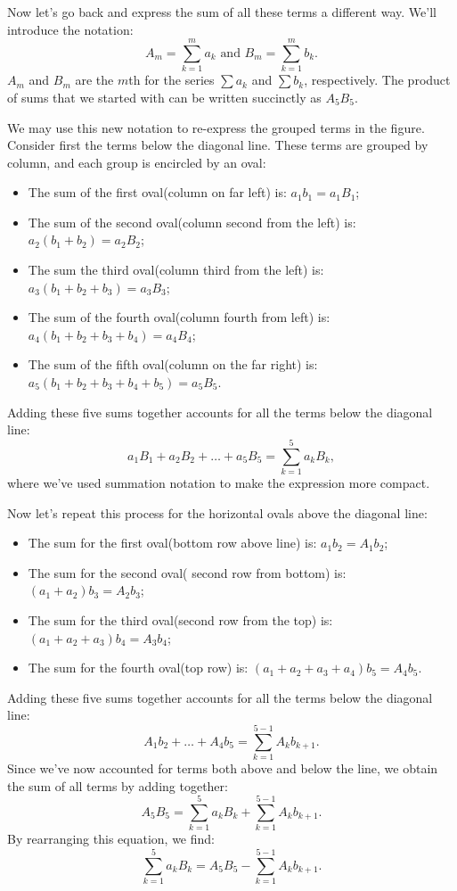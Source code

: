 Now let's go back and express the sum of all these terms a different way. We'll introduce the notation:
\[ A_{m}= \sum_{k=1}^{m}a_{k} \text{ and } B_{m}= \sum_{k=1}^{m}b_{k}. \]
$A_m$ and $B_m$ are the $m$th  for the series $\sum a_k$ and $\sum b_k$, respectively.
The product of sums that we started with can be written succinctly as $A_{5}B_{5}$. 

We may use this new notation to 
re-express the grouped terms in the figure. 
Consider first the terms below the diagonal line. These terms are grouped by column, and each group is encircled by an oval:
\begin{itemize}
\item
The sum of the first oval(column on far left) is: $a_{1}b_{1}= a_{1}B_{1}$;
 \item
The sum of the second oval(column second from the left) is: $a_{2}\left ( b_{1}+b_{2} \right )= a_{2}B_{2}$;
\item
The sum the third oval(column third from the left) is: $a_{3}\left ( b_{1}+b_{2}+b_{3} \right )= a_{3}B_{3}$;
\item
The sum of the fourth oval(column fourth from left) is: $a_{4}\left ( b_{1}+b_{2}+b_{3}+b_{4} \right )= a_{4}B_{4}$;
\item 
The sum of the fifth oval(column on the far right) is: $a_{5}\left (b _{1}+b_{2}+b_{3}+b_{4}+b_{5} \right )=a _{5}B_{5}$.
\end{itemize}
Adding these five sums together accounts for all the terms below the diagonal line:
\[ a_1B_1 + a_2B_2 + \ldots + a_5B_5 = \sum_{k=1}^{5}a_kB_k,\]
where we've used summation notation to make the expression more compact.

Now let's repeat this process for the horizontal ovals above the diagonal line:
\begin{itemize}
\item
The sum for the first oval(bottom row above line) is: $a_{1}b_{2}= A_{1}b_{2}$;
\item
The sum for the second oval( second row from bottom) is: $\left ( a_{1}+a_{2} \right)b_{3}= A_{2}b_{3}$;
\item
The sum for the third oval(second row from the top) is: $\left ( a_{1}+a_{2}+a_{3} \right )b_{4}= A_{3}b_{4}$;
\item
The sum for the fourth oval(top row) is: $\left ( a_{1}+a_{2}+a_{3}+a_{4} \right)b_{5}= A_{4}b_{5}$.
\end{itemize}
Adding these five sums together accounts for all the terms below the diagonal line:
\[ A_1b_2 +  \ldots + A_4b_5 = \sum_{k=1}^{5-1}A_kb_{k+1}.\]
Since we've now accounted for terms both above and below the line, we obtain the sum of all terms by adding together:
\[ A_{5}B_{5}= \sum_{k=1}^{5}a_{k}B_{k}+\sum_{k=1}^{5-1}A_{k}b_{k+1}. \]
By rearranging this equation, we find:
\[ \sum_{k=1}^{5}a_{k}B_{k}= A_{5}B_{5}-\sum_{k=1}^{5-1}A_{k}b_{k+1}. \]

